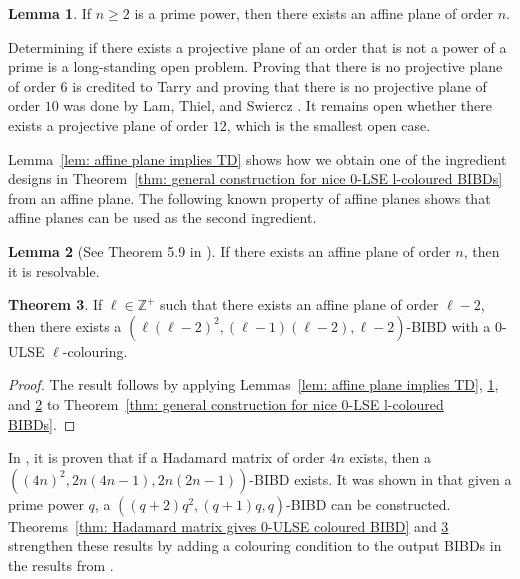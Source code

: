 \documentclass[12pt]{article}
\theoremstyle{definition}
\newtheorem{theorem}{Theorem}[section]
\newtheorem{lemma}[theorem]{Lemma}
\begin{document}
\begin{lemma}\label{lem: affine planes of prime power order}
    If $n\geq 2$ is a prime power, then there exists an affine plane of order $n$.
\end{lemma}

Determining if there exists a projective plane of an order that is not a power of a prime is a long-standing open problem. Proving that there is no projective plane of order $6$ is credited to Tarry \cite{T1900} and proving that there is no projective plane of order $10$ was done by Lam, Thiel, and Swiercz \cite{LTS89}. It remains open whether there exists a projective plane of order $12$, which is the smallest open case. 

Lemma~\ref{lem: affine plane implies TD} shows how we obtain one of the ingredient designs in Theorem~\ref{thm: general construction for nice 0-LSE l-coloured BIBDs} from an affine plane. The following known property of affine planes shows that affine planes can be used as the second ingredient. 

\begin{lemma}[See Theorem 5.9 in \cite{S04}]\label{lem: affine planes are resolvable}
    If there exists an affine plane of order $n$, then it is resolvable. 
\end{lemma}

\begin{theorem}\label{thm: affine plane gives 0-LSE l-col BIBD}
    If $\ell \in \mathbb{Z}^+$ such that there exists an affine plane of order $\ell-2$, then there exists a $(\ell(\ell-2)^2, (\ell-1)(\ell-2), \ell-2)$-BIBD with a $0$-ULSE $\ell$-colouring.
\end{theorem}

\begin{proof}
    The result follows by applying Lemmas~\ref{lem: affine plane implies TD}, \ref{lem: affine planes of prime power order}, and \ref{lem: affine planes are resolvable} to Theorem~\ref{thm: general construction for nice 0-LSE l-coloured BIBDs}.
\end{proof}

In \cite{S69}, it is proven that if a Hadamard matrix of order $4n$ exists, then a $((4n)^2, 2n(4n-1), 2n(2n-1))$-BIBD exists. It was shown in \cite{AS69} that given a prime power $q$, a $((q+2)q^2, (q+1)q, q)$-BIBD can be constructed. Theorems~\ref{thm: Hadamard matrix gives 0-ULSE coloured BIBD} and \ref{thm: affine plane gives 0-LSE l-col BIBD} strengthen these results by adding a colouring condition to the output BIBDs in the results from \cite{AS69, S69}.
\end{document}
